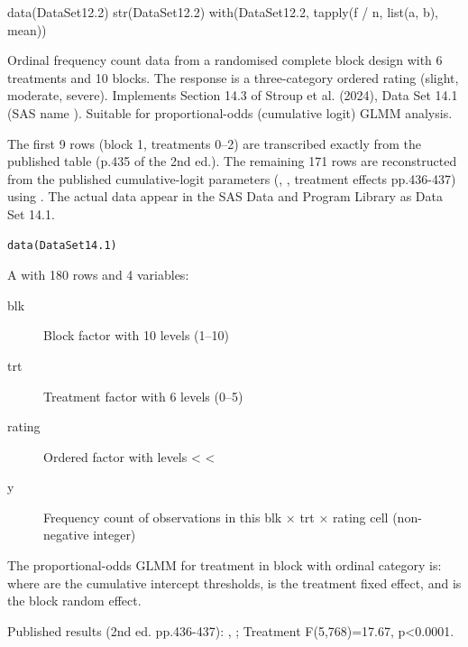 \documentclass[a4paper]{book}
\begin{document}
%
\begin{Examples}
\begin{ExampleCode}
data(DataSet12.2)
str(DataSet12.2)
with(DataSet12.2, tapply(f / n, list(a, b), mean))
\end{ExampleCode}
\end{Examples}
%
\begin{Description}
Ordinal frequency count data from a randomised complete block design with
6 treatments and 10 blocks.  The response is a three-category ordered rating
(slight, moderate, severe).  Implements Section 14.3 of Stroup et al. (2024),
Data Set 14.1 (SAS name ).  Suitable for proportional-odds
(cumulative logit) GLMM analysis.

 The first 9 rows (block 1, treatments 0–2)
are transcribed exactly from the published table (p.435 of the 2nd ed.).
The remaining 171 rows are reconstructed from the published cumulative-logit
parameters (, , treatment
effects pp.436-437) using .  The actual data appear in
the SAS Data and Program Library as Data Set 14.1.
\end{Description}
%
\begin{Usage}
\begin{verbatim}
data(DataSet14.1)
\end{verbatim}
\end{Usage}
%
\begin{Format}
A  with 180 rows and 4 variables:
\begin{description}

\item[blk] Block factor with 10 levels (1–10)
\item[trt] Treatment factor with 6 levels (0–5)
\item[rating] Ordered factor with levels  <  <
\item[y] Frequency count of observations in this blk × trt × rating cell
(non-negative integer)

\end{description}

\end{Format}
%
\begin{Details}
The proportional-odds GLMM for treatment  in block  with
ordinal category  is:
where  are the cumulative intercept thresholds,
 is the treatment fixed effect, and
 is the block random effect.

Published results (2nd ed. pp.436-437):
, ;
Treatment F(5,768)=17.67, p<0.0001.
\end{Details}
\end{document}

